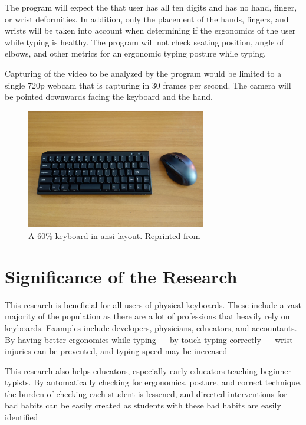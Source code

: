 \documentclass{report}
\begin{document}
The program will expect the that user has all ten digits and has no hand,
finger, or wrist deformities. In addition, only the placement of the hands,
fingers, and wrists will be taken into account when determining if the
ergonomics of the user while typing is healthy. The program will not check
seating position, angle of elbows, and other metrics for an ergonomic typing
posture while typing.

Capturing of the video to be analyzed by the program would be limited to a
single 720p webcam that is capturing in 30 frames per second. The camera will be
pointed downwards facing the keyboard and the hand.

\begin{figure}[H]
	\centering
	\includegraphics[width=0.7\textwidth]{60.jpg}
	\caption{A 60\% keyboard in \ac{ansi} layout. Reprinted from }
	\label{fig:60}
	\centering
\end{figure}


\section{Significance of the Research}
This research is beneficial for all users of physical keyboards. These include a
vast majority of the population as there are a lot of professions that heavily
rely on keyboards. Examples include developers, physicians, educators, and
accountants. By having better ergonomics while typing --- by touch typing
correctly --- wrist injuries can be prevented, and typing speed may be increased

This research also helps educators, especially early educators teaching beginner
typists. By automatically checking for ergonomics, posture, and correct
technique, the burden of checking each student is lessened, and directed
interventions for bad habits can be easily created as students with these bad
habits are easily identified
\end{document}
